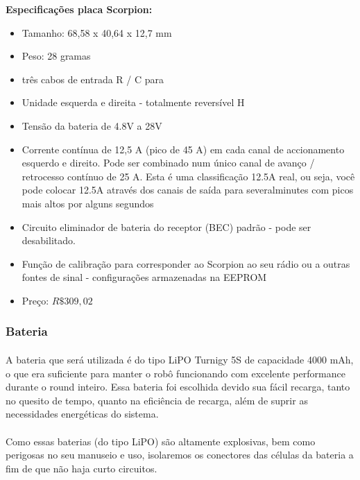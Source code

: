 \documentclass{article}
\begin{document}
                \textbf{Especificações placa Scorpion:}
                \begin{itemize}
                    \item Tamanho: 68,58 x 40,64 x 12,7 mm
                    \item Peso: 28 gramas
                    \item três cabos de entrada R / C para
                    \item Unidade esquerda e direita - totalmente reversível H
                    \item Tensão da bateria de 4.8V a 28V
                    \item Corrente contínua de 12,5 A (pico de 45 A) em cada canal de accionamento esquerdo e direito. Pode ser combinado num único canal de avanço / retrocesso contínuo de 25 A. Esta é uma classificação 12.5A real, ou seja, você pode colocar 12.5A através dos canais de saída para severalminutes com picos mais altos por alguns segundos
                    \item Circuito eliminador de bateria do receptor (BEC) padrão - pode ser desabilitado.
                    \item Função de calibração para corresponder ao Scorpion ao seu rádio ou a outras fontes de sinal - configurações armazenadas na EEPROM
                    \item Preço: $R\$ 309,02$
                \end{itemize}

            \subsubsection{Bateria}
                \paragraph{}
                A bateria que será utilizada é do tipo LiPO Turnigy 5S de capacidade 4000 mAh, o que era suficiente para manter o robô funcionando com excelente performance durante o round inteiro. Essa bateria foi escolhida devido sua fácil recarga, tanto no quesito de tempo, quanto na eficiência de recarga, além de suprir as necessidades energéticas do sistema.
                \paragraph{}
                Como essas baterias (do tipo LiPO) são altamente explosivas, bem como perigosas no seu manuseio e uso, isolaremos os conectores das células da bateria a fim de que não haja curto circuitos.
\end{document}
